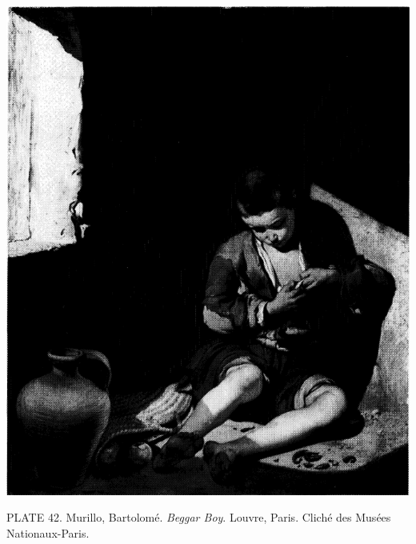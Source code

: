 \protect\hypertarget{20_ILLUSTRATIONS_FOLLOW_PAGE.xhtmlux5cux23id_37}{}{}\includegraphics{include/html/images/357_1.png}

PLATE 42. Murillo, Bartolomé. \emph{Beggar Boy}. Louvre, Paris. Cliché
des Musées Nationaux-Paris.

